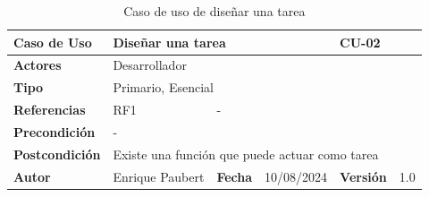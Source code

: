 \begin{table}[!ht]
    \begin{tabular}{|l|l|l|l|l|l|}
	\hline
	\textbf{Caso de Uso} & \multicolumn{3}{l|}{Diseñar una tarea} & \multicolumn{2}{l|}{CU-02} \\ \hline
	\textbf{Actores} & \multicolumn{5}{l|}{Desarrollador} \\ \hline
	\textbf{Tipo} & \multicolumn{5}{l|}{Primario, Esencial} \\ \hline
	\textbf{Referencias} & RF1 & \multicolumn{4}{l|}{-} \\ \hline
	\textbf{Precondición} & \multicolumn{5}{l|}{-} \\ \hline
	\textbf{Postcondición} & \multicolumn{5}{l|}{Existe una función que puede actuar como tarea} \\ \hline
	\textbf{Autor} & Enrique Paubert & \textbf{Fecha} & 10/08/2024 & \textbf{Versión} & 1.0 \\ \hline
    \end{tabular}%
    \caption{Caso de uso de diseñar una tarea}
    \label{CU-02}
\end{table}

